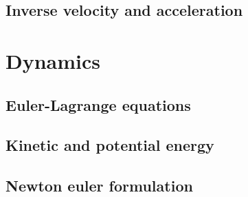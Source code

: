 \subsection{Inverse velocity and acceleration}

\section{Dynamics}
\lipsum[1]
\subsection{Euler-Lagrange equations}
\subsection{Kinetic and potential energy}
\subsection{Newton euler formulation}